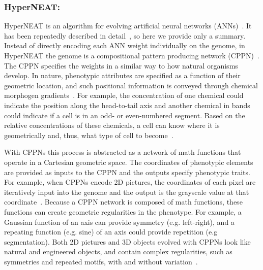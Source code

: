 
\subsubsection{HyperNEAT:}

HyperNEAT is an algorithm for evolving artificial neural networks (ANNs)~\cite{stanley2009hypercube}. It has been repeatedly described in detail~\cite{stanley2009hypercube,gauci2007generating,clune2011performance},  so here we provide only a summary. Instead of directly encoding each ANN weight individually on the genome, in HyperNEAT the genome is a compositional pattern producing network (CPPN)~\cite{stanley2007CPPN}. The CPPN specifies the weights in a similar way to how natural organisms develop. In nature, phenotypic attributes are specified as a function of their geometric location, and such positional information is conveyed through chemical morphogen gradients~\cite{carroll2005endless}. For example, the concentration of one chemical could indicate the position along the head-to-tail axis and another chemical in bands could indicate if a cell is in an odd- or even-numbered segment. Based on the relative concentrations of these chemicals, a cell can know where it is geometrically and, thus, what type of cell to become~\cite{carroll2005endless}. 

With CPPNs this process is abstracted as a network of math functions that operate in a Cartesian geometric space. The coordinates of phenotypic elements are provided as inputs to the CPPN and the outputs specify phenotypic traits. For example, when CPPNs encode 2D pictures, the coordinates of each pixel are iteratively input into the genome and the output is the grayscale value at that coordinate~\cite{secretan2011picbreeder}. Because a CPPN network is composed of math functions, these functions can create geometric regularities in the phenotype. For example, a Gaussian function of an axis can provide symmetry (e.g. left-right), and a repeating function (e.g. sine) of an axis could provide repetition (e.g segmentation). Both 2D pictures and 3D objects evolved with CPPNs look like natural and engineered objects, and contain complex regularities, such as symmetries and repeated motifs, with and without variation~\cite{secretan2011picbreeder,clune2011objects}. 



